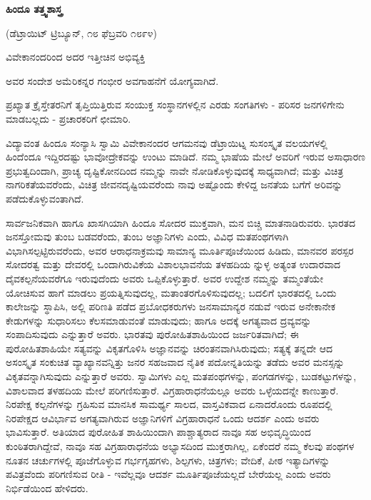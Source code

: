 \begin{center}
\textbf{ಹಿಂದೂ ತತ್ತ್ವಶಾಸ್ತ್ರ}
\end{center}

\begin{center}
(ಡೆಟ್ರಾಯಿಟ್ ಟ್ರಿಬ್ಯೂನ್, ೧೮ ಫೆಬ್ರವರಿ ೧೮೯೪)
\end{center}

\begin{center}
ವಿವೇಕಾನಂದರಿಂದ ಅದರ ಇತ್ತೀಚಿನ ಅಭಿವ್ಯಕ್ತಿ
\end{center}

\begin{center}
ಅವರ ಸಂದೇಶ ಅಮೆರಿಕನ್ನರ ಗಂಭೀರ ಅವಗಾಹನೆಗೆ ಯೋಗ್ಯವಾಗಿದೆ.
\end{center}

ಪ್ರಖ್ಯಾತ ಕ್ರೈಸ್ತೇತರನಿಗೆ ತೃಪ್ತಿಯಿತ್ತಿರುವ ಸಂಯುಕ್ತ ಸಂಸ್ಥಾನಗಳಲ್ಲಿನ ಎರಡು ಸಂಗತಿಗಳು - ಪರಿಸರ ಜನಗಳಿಗೇನು ಮಾಡಬಲ್ಲದು - ಪ್ರಚಾರಕರಿಗೆ ಛೀಮಾರಿ.

ವಿದ್ಯಾವಂತ ಹಿಂದೂ ಸಂನ್ಯಾಸಿ ಸ್ವಾಮಿ ವಿವೇಕಾನಂದರ ಆಗಮನವು ಡೆಟ್ರಾಯಿಟ್ನ ಸುಸಂಸ್ಕೃತ ವಲಯಗಳಲ್ಲಿ ಹಿಂದೆಂದೂ ಇದ್ದಿರದಷ್ಟು ಭಾವೋದ್ರೇಕವನ್ನು ಉಂಟು ಮಾಡಿದೆ. ನಮ್ಮ ಭಾಷೆಯ ಮೇಲೆ ಅವರಿಗೆ ಇರುವ ಅಸಾಧಾರಣ ಪ್ರಭುತ್ವದಿಂದಾಗಿ, ಪ್ರಾಚ್ಯ ದೃಷ್ಟಿಕೋನದಿಂದ ನಮ್ಮನ್ನು ನಾವೇ ನೋಡಿಕೊಳ್ಳುವುದಕ್ಕೆ ಸಾಧ್ಯವಾಗಿದೆ; ಮತ್ತು ವಿಚಿತ್ರ ನಾಗರಿಕತೆಯವರೆಂದು, ವಿಚಿತ್ರ ಜೀವನದೃಷ್ಟಿಯವರೆಂದು ನಾವು ಅಷ್ಟೊಂದು ಕೇಳಿದ್ದ ಜನತೆಯ ಬಗೆಗೆ ಅರಿವನ್ನು ಪಡೆದುಕೊಳ್ಳುವಂತಾಗಿದೆ.

ಸಾರ್ವಜನಿಕವಾಗಿ ಹಾಗೂ ಖಾಸಗಿಯಾಗಿ ಹಿಂದೂ ಸೋದರ ಮುಕ್ತವಾಗಿ, ಮನ ಬಿಚ್ಚಿ ಮಾತನಾಡಿರುವರು. ಭಾರತದ ಜನಸ್ತೋಮವು ತುಂಬ ಬಡವರೆಂದು, ತುಂಬ ಅಜ್ಞಾನಿಗಳು ಎಂದು, ವಿವಿಧ ಮತಪಂಥಗಳಾಗಿ ವಿಭಾಗಿಸಲ್ಪಟ್ಟಿರುವರೆಂದು, ಅವರ ಆರಾಧನಾಕ್ರಮವು ಸಾಮಾನ್ಯ ಮೂರ್ತಿಪೂಜೆಯಿಂದ ಹಿಡಿದು, ಮಾನವರ ಪರಸ್ಪರ ಸೋದರತ್ವ ಮತ್ತು ದೇವರಲ್ಲಿ ಒಂದಾಗಿರುವಿಕೆಯ ವಿಶಾಲಭಾವನೆಯ ತಳಹದಿಯ ನ್ನುಳ್ಳ ಅತ್ಯಂತ ಉದಾರವಾದ ದೈವಕಲ್ಪನೆಯವರೆಗೂ ಇರುವುದೆಂದು ಅವರು ಒಪ್ಪಿಕೊಳ್ಳುತ್ತಾರೆ. ಅವರ ಉದ್ದೇಶ ನಮ್ಮನ್ನು ತಮ್ಮಂತೆಯೇ ಯೋಚಿಸುವ ಹಾಗೆ ಮಾಡಲು ಪ್ರಯತ್ನಿಸುವುದಲ್ಲ, ಮತಾಂತರಗೊಳಿಸುವುದಲ್ಲ; ಬದಲಿಗೆ ಭಾರತದಲ್ಲಿ ಒಂದು ಕಾಲೇಜನ್ನು ಸ್ಥಾಪಿಸಿ, ಅಲ್ಲಿ ಪರಿಣತಿ ಪಡೆದ ಪ್ರಬೋಧಕರುಗಳು ಜನಸಾಮಾನ್ಯರ ನಡುವೆ ಇರುವ ಅನೇಕಾನೇಕ ಕೇಡುಗಳನ್ನು ಸುಧಾರಿಸಲು ಕೆಲಸಮಾಡುವಂತೆ ಮಾಡುವುದು; ಹಾಗೂ ಅದಕ್ಕೆ ಅಗತ್ಯವಾದ ದ್ರವ್ಯವನ್ನು ಸಂಪಾದಿಸುವುದು ಎನ್ನುತ್ತಾರೆ ಅವರು. ಭಾರತವು ಪುರೋಹಿತಶಾಹಿಯಿಂದ ಜರ್ಜರಿತವಾಗಿದೆ; ಈ ಪುರೋಹಿತಶಾಹಿಯೇ ಸತ್ಯವನ್ನು ವಿಕೃತಗೊಳಿಸಿ ಅಜ್ಞಾನವನ್ನು ಚಿರಂತನವಾಗಿಸಿರುವುದು; ಸತ್ಯಕ್ಕೆ ತನ್ನದೇ ಆದ ಅಸಂಸ್ಕೃತ ಸಂಕುಚಿತ ವ್ಯಾಖ್ಯಾನವನ್ನಿತ್ತು ಜನರ ಸಹಜವಾದ ನೈತಿಕ ಪದೋನ್ನತಿಯನ್ನು ತಡೆದು ಅವರ ಮನಸ್ಸನ್ನು ವಿಕೃತವನ್ನಾಗಿಸುವುದು ಎನ್ನುತ್ತಾರೆ ಅವರು. ಸ್ವಾಮಿಗಳು ಎಲ್ಲ ಮತಪಂಥಗಳನ್ನು, ಪಂಗಡಗಳನ್ನು, ಬುಡಕಟ್ಟುಗಳನ್ನು, ವಿಶಾಲವಾದ ತಳಹದಿಯ ಮೇಲೆ ಪರಿಗಣಿಸುತ್ತಾರೆ. ವಿಗ್ರಹಾರಾಧನೆಯಲ್ಲೂ ಅವರು ಒಳ್ಳೆಯದನ್ನೇ ಕಾಣುತ್ತಾರೆ. ನಿರಪೇಕ್ಷ ಕಲ್ಪನೆಗಳನ್ನು ಗ್ರಹಿಸುವ ಮಾನಸಿಕ ಸಾಮರ್ಥ್ಯ ಸಾಲದ, ವಾಸ್ತವಿಕವಾದ ಏನಾದರೊಂದು ರೂಪದಲ್ಲಿ ನಿರಪೇಕ್ಷದ ಆವಿರ್ಭಾವ ಅಗತ್ಯವಾಗಿರುವ ಅಜ್ಞಾನಿಗಳಿಗೆ ವಿಗ್ರಹಾರಾಧನೆ ಒಂದು ಆದರ್ಶ ಎಂದು ಅವರು ಭಾವಿಸುತ್ತಾರೆ. ಅತಿಯಾದ ಪುರೋಹಿತ ಶಾಹಿಯಿಂದಾಗಿ ಪಾಶ್ಚಾತ್ಯರಾದ ನಾವೂ ಸಹ ಅಭಿವೃದ್ಧಿಯಿಂದ ಕುಂಠಿತರಾಗಿದ್ದೇವೆ, ನಾವೂ ಸಹ ವಿಗ್ರಹಾರಾಧನೆಯ ಅಭ್ಯಾಸದಿಂದ ಮುಕ್ತರಾಗಿಲ್ಲ, ಏಕೆಂದರೆ ನಮ್ಮ ಕೆಲವು ಪಂಥಗಳ ನೂತನ ಚರ್ಚುಗಳಲ್ಲಿ ಪೂಜೆಗೊಳ್ಳುವ ಗರ್ಭಗೃಹಗಳು, ಶಿಲ್ಪಗಳು, ಚಿತ್ರಗಳು; ವೇದಿಕೆ, ಪೀಠ ಇತ್ಯಾದಿಗಳನ್ನು ಪವಿತ್ರವೆಂದು ಪರಿಗಣಿಸುವ ರೀತಿ - ಇವೆಲ್ಲವೂ ಆದರ್ಶ ಮೂರ್ತಿಪೂಜೆಯಲ್ಲದೆ ಬೇರೆಯಲ್ಲ ಎಂದು ಅವರು ನಿರ್ಭಿಡೆಯಿಂದ ಹೇಳಿದರು.

